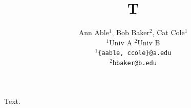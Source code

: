 \documentclass{article}
\title{T}
\author{Ann Able$^1$, Bob Baker$^2$, Cat Cole$^1$ \\
$^1$Univ A \quad $^2$Univ B \\
{\tt\small $^1$\{aable, ccole\}@a.edu} \\
{\tt\small $^2$bbaker@b.edu}}
\begin{document}
\maketitle
Text.
\end{document}
